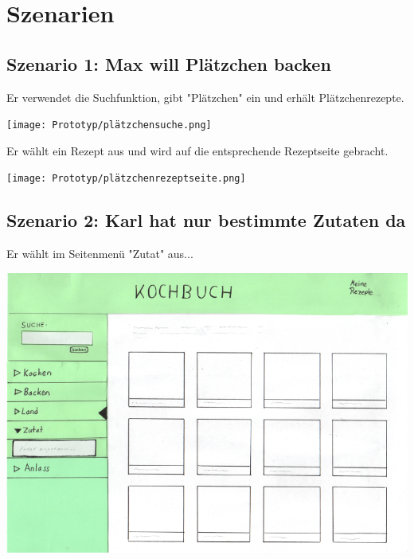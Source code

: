 \documentclass[parskip,10pt,abstracton]{scrartcl}
\begin{document}
\pagebreak
\section*{Szenarien}

\subsection*{Szenario 1: Max will Plätzchen backen}

Er verwendet die Suchfunktion, gibt "Plätzchen" ein und erhält Plätzchenrezepte.
\begin{center}
\texttt{[image: Prototyp/plätzchensuche.png]}
\end{center}

Er wählt ein Rezept aus und wird auf die entsprechende Rezeptseite gebracht.
\begin{center}
\texttt{[image: Prototyp/plätzchenrezeptseite.png]}
\end{center}


\subsection*{Szenario 2: Karl hat nur bestimmte Zutaten da}

Er wählt im Seitenmenü "Zutat" aus...
\begin{center}
\includegraphics[scale=0.4]{Prototyp/menu_zutat.png}
\end{center}
\end{document}
